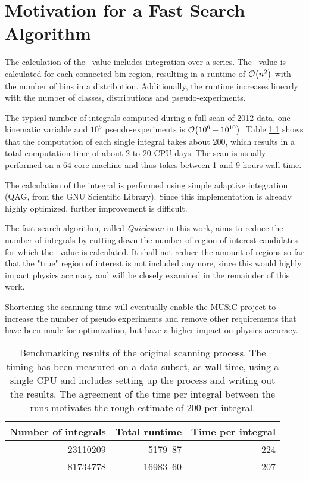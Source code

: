 
\chapter{Motivation for a Fast Search Algorithm}

The calculation of the \p~value includes integration over a series. The \p~value is calculated for each connected bin region, resulting in a runtime of $\order{n^2}$ with the number of bins in a distribution. Additionally, the runtime increases linearly with the number of classes, distributions and pseudo-experiments.

The typical number of integrals computed during a full scan of 2012 data, one kinematic variable and $10^5$ pseudo-experiments is $\order{10^{9} - 10^{10}}$. Table \ref{tbl:motivation_timing} shows that the computation of each single integral takes about \unit{200}{\micro\second}, which results in a total computation time of about 2 to 20 CPU-days. The scan is usually performed on a 64 core machine and thus takes between 1 and 9 hours wall-time.

The calculation of the integral is performed using simple adaptive integration (QAG, from the GNU Scientific Library). Since this implementation is already highly optimized, further improvement is difficult.

The fast search algorithm, called \emph{Quickscan} in this work, aims to reduce the number of integrals by cutting down the number of region of interest candidates for which the \p~value is calculated. It shall not reduce the amount of regions so far that the "true" region of interest is not included anymore, since this would highly impact physics accuracy and will be closely examined in the remainder of this work.

Shortening the scanning time will eventually enable the MUSiC project to increase the number of pseudo experiments and remove other requirements that have been made for optimization, but have a higher impact on physics accuracy.

\begin{table}[htbp]
	\centering
	\begin{tabular}{| r | r || r |}
		\hline
		Number of integrals & Total runtime & Time per integral \\
		\hline \hline
		23110209 & \unit{5179.87}{\second} & \unit{224}{\micro\second} \\
		81734778 & \unit{16983.60}{\second} & \unit{207}{\micro\second} \\
		\hline
	\end{tabular}
	\caption{Benchmarking results of the original scanning process. The timing has been measured on a data subset, as wall-time, using a single CPU and includes setting up the process and writing out the results. The agreement of the time per integral between the runs motivates the rough estimate of \unit{200}{\micro\second} per integral.}
	\label{tbl:motivation_timing}
\end{table}